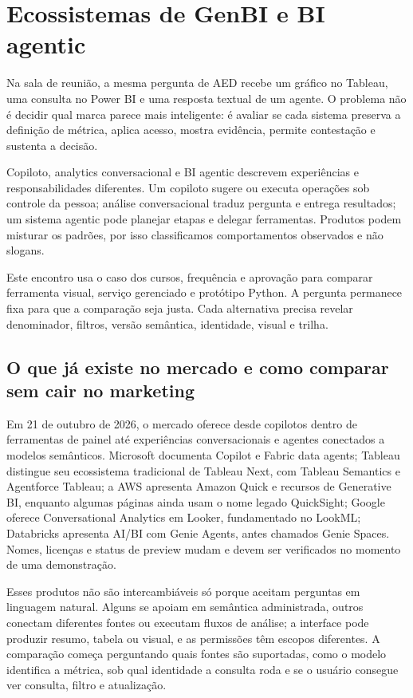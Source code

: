 \chapter{Ecossistemas de GenBI e BI agentic}

Na sala de reunião, a mesma pergunta de AED recebe um gráfico no Tableau, uma consulta no Power BI e uma resposta textual de um agente. O problema não é decidir qual marca parece mais inteligente: é avaliar se cada sistema preserva a definição de métrica, aplica acesso, mostra evidência, permite contestação e sustenta a decisão.

Copiloto, analytics conversacional e BI agentic descrevem experiências e responsabilidades diferentes. Um copiloto sugere ou executa operações sob controle da pessoa; análise conversacional traduz pergunta e entrega resultados; um sistema agentic pode planejar etapas e delegar ferramentas. Produtos podem misturar os padrões, por isso classificamos comportamentos observados e não slogans.

Este encontro usa o caso dos cursos, frequência e aprovação para comparar ferramenta visual, serviço gerenciado e protótipo Python. A pergunta permanece fixa para que a comparação seja justa. Cada alternativa precisa revelar denominador, filtros, versão semântica, identidade, visual e trilha.

\section{O que já existe no mercado e como comparar sem cair no marketing}

Em 21 de outubro de 2026, o mercado oferece desde copilotos dentro de ferramentas de painel até experiências conversacionais e agentes conectados a modelos semânticos. Microsoft documenta Copilot e Fabric data agents; Tableau distingue seu ecossistema tradicional de Tableau Next, com Tableau Semantics e Agentforce Tableau; a AWS apresenta Amazon Quick e recursos de Generative BI, enquanto algumas páginas ainda usam o nome legado QuickSight; Google oferece Conversational Analytics em Looker, fundamentado no LookML; Databricks apresenta AI/BI com Genie Agents, antes chamados Genie Spaces. Nomes, licenças e status de preview mudam e devem ser verificados no momento de uma demonstração.

Esses produtos não são intercambiáveis só porque aceitam perguntas em linguagem natural. Alguns se apoiam em semântica administrada, outros conectam diferentes fontes ou executam fluxos de análise; a interface pode produzir resumo, tabela ou visual, e as permissões têm escopos diferentes. A comparação começa perguntando quais fontes são suportadas, como o modelo identifica a métrica, sob qual identidade a consulta roda e se o usuário consegue ver consulta, filtro e atualização.

